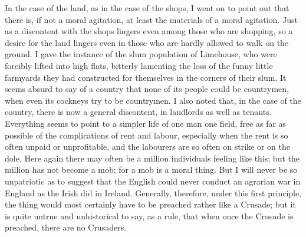 \documentclass{book}
\begin{document}
In the case of the land, as in the case of the shops, I went on to point out that there is, if not a moral agitation, at least the materials of a moral agitation. Just as a discontent with the shops lingers even among those who are shopping, so a desire for the land lingers even in those who are hardly allowed to walk on the ground. I gave the instance of the slum population of Limehouse, who were forcibly lifted into high flats, bitterly lamenting the loss of the funny little farmyards they had constructed for themselves in the corners of their slum. It seems absurd to say of a country that none of its people could be countrymen, when even its cockneys try to be countrymen. I also noted that, in the case of the country, there is now a general discontent, in landlords as well as tenants. Everything seems to point to a simpler life of one man one field, free as far as possible of the complications of rent and labour, especially when the rent is so often unpaid or unprofitable, and the labourers are so often on strike or on the dole. Here again there may often be a million individuals feeling like this; but the million has not become a mob; for a mob is a moral thing. But I will never be so unpatriotic as to suggest that the English could never conduct an agrarian war in England as the Irish did in Ireland. Generally, therefore, under this first principle, the thing would most certainly have to be preached rather like a Crusade; but it is quite untrue and unhistorical to say, as a rule, that when once the Crusade is preached, there are no Crusaders.
\end{document}
